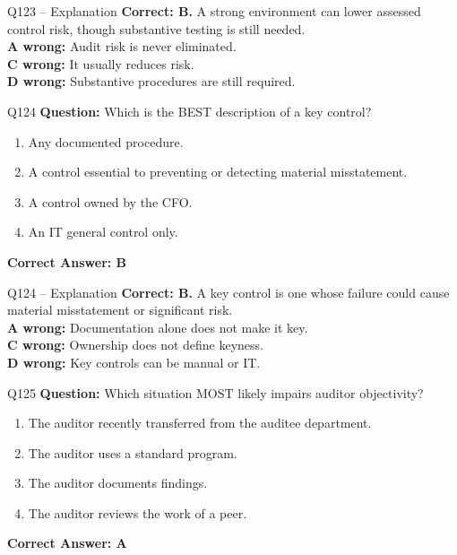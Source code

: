 \documentclass[aspectratio=169,10pt]{beamer}
\begin{document}
	\begin{frame}[t]{Q123 -- Explanation}
		\small
		\textbf{Correct: B.} A strong environment can lower assessed control risk, though substantive testing is still needed. \\[4pt]
		\textbf{A wrong:} Audit risk is never eliminated. \\[2pt]
		\textbf{C wrong:} It usually reduces risk. \\[2pt]
		\textbf{D wrong:} Substantive procedures are still required.
	\end{frame}
	
	\begin{frame}[t]{Q124}
		\small
		\textbf{Question:} Which is the BEST description of a key control?
		\begin{enumerate}[label=\Alph*.,itemsep=1pt,topsep=2pt]
			\item Any documented procedure.
			\item A control essential to preventing or detecting material misstatement.
			\item A control owned by the CFO.
			\item An IT general control only.
		\end{enumerate}
		\vspace{4pt}
		\textbf{Correct Answer: B}
	\end{frame}
	
	\begin{frame}[t]{Q124 -- Explanation}
		\small
		\textbf{Correct: B.} A key control is one whose failure could cause material misstatement or significant risk. \\[4pt]
		\textbf{A wrong:} Documentation alone does not make it key. \\[2pt]
		\textbf{C wrong:} Ownership does not define keyness. \\[2pt]
		\textbf{D wrong:} Key controls can be manual or IT.
	\end{frame}
	
	\begin{frame}[t]{Q125}
		\small
		\textbf{Question:} Which situation MOST likely impairs auditor objectivity?
		\begin{enumerate}[label=\Alph*.,itemsep=1pt,topsep=2pt]
			\item The auditor recently transferred from the auditee department.
			\item The auditor uses a standard program.
			\item The auditor documents findings.
			\item The auditor reviews the work of a peer.
		\end{enumerate}
		\vspace{4pt}
		\textbf{Correct Answer: A}
	\end{frame}
	
\end{document}
